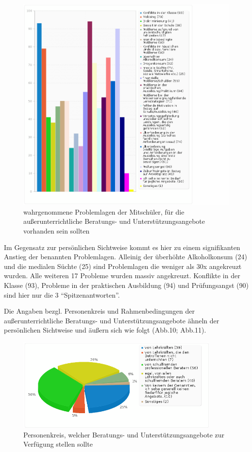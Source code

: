 \begin{figure}[hp]
	\centering
		\includegraphics[width=1.0\textwidth]{images/Problemlagen-der-Mitschueler.png}
	\caption{wahrgenommene Problemlagen der Mitschüler, für die außerunterrichtliche Beratungs- und Unterstützungsangebote vorhanden sein sollten}
	\label{fig:Problemlagen-der-Mitschueler}
\end{figure}

Im Gegensatz zur persönlichen Sichtweise kommt es hier zu einem signifikanten Anstieg der benannten Problemlagen. Alleinig der überhöhte Alkoholkonsum (24) und die medialen Süchte (25) sind Problemlagen die weniger als 30x angekreuzt wurden. Alle weiteren 17 Probleme wurden massiv angekreuzt. Konflikte in der Klasse (93), Probleme in der praktischen Ausbildung (94) und Prüfungsangst (90) sind hier nur die 3 "`Spitzenantworten"'.

Die Angaben bezgl. Personenkreis und Rahmenbedingungen der außerunterrichtliche Beratungs- und Unterstützungsangebote ähneln der persönlichen Sichtweise und äußern sich wie folgt (Abb.10; Abb.11). 

\begin{figure}[hp]
	\centering
		\includegraphics[width=0.9\textwidth]{images/Personenkreis-fuer-unterstuetzungsangebote.png}
	\caption{Personenkreis, welcher Beratungs- und Unterstützungsangebote zur Verfügung stellen sollte}
	\label{fig:Personenkreis-fuer-unterstuetzungsangebote}
\end{figure}

